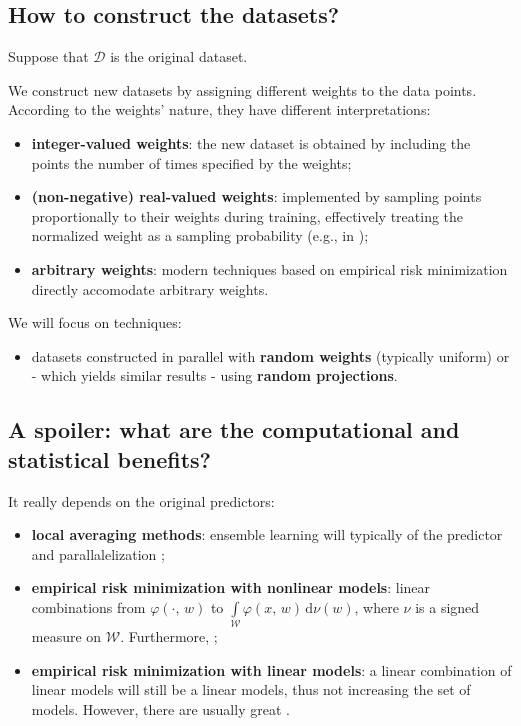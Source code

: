 \documentclass[
11pt,notheorems,hyperref={pdfauthor=whatever}
]{beamer}
\begin{document}
\subsection{How to construct the datasets?}
\begin{frame}
    Suppose that \(\mathcal{D}\) is the original dataset. 

    We construct new datasets by assigning different weights to the data points. According to the weights' nature, they have different interpretations:
    \begin{itemize}
        \item \alert{\textbf{integer-valued weights}}: the new dataset is obtained by including the points the number of times specified by the weights;
        \item \alert{\textbf{(non-negative) real-valued weights}}: implemented by sampling points proportionally to their weights during training, effectively treating the normalized weight as a sampling probability (e.g., in );
        \item \alert{\textbf{arbitrary weights}}: modern techniques based on empirical risk minimization directly accomodate arbitrary weights. 
    \end{itemize}
    We will focus on  techniques:
    \begin{itemize}
        \item datasets constructed in parallel with \alert{\textbf{random weights}} (typically uniform) or - which yields similar results - using \alert{\textbf{random projections}}.
    \end{itemize}
\end{frame}

\subsection{A spoiler: what are the computational and statistical benefits?}
\begin{frame}
    It really depends on the original predictors:
    \begin{itemize}
        \item \alert{\textbf{local averaging methods}}: ensemble learning will typically  of the predictor and parallalelization ;
        \item \alert{\textbf{empirical risk minimization with nonlinear models}}: linear combinations  from \(\varphi(\cdot,\,w)\) to \(\int\limits_{\mathcal{W}}\varphi(x,\,w)\,\mathrm{d}\nu(w)\), where \(\nu\) is a signed measure on \(\mathcal{W}\). Furthermore, ;
        \item \alert{\textbf{empirical risk minimization with linear models}}: a linear combination of linear models will still be a linear models, thus not increasing the set of models. However, there are usually great .
    \end{itemize} 
\end{frame}
\end{document}
